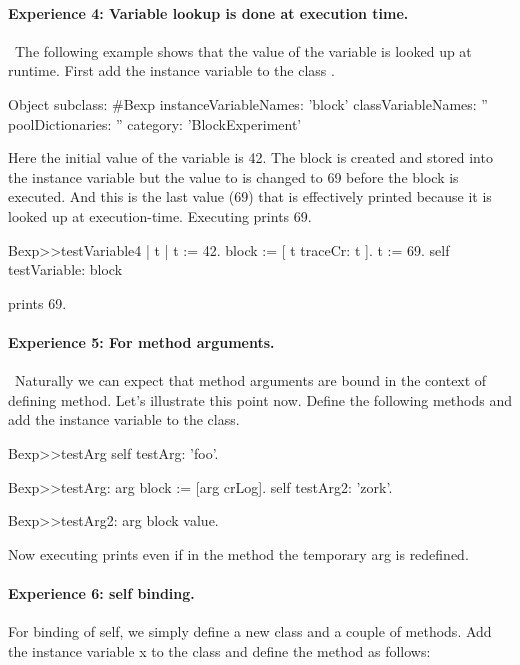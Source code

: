\documentclass[a4paper,10pt,twoside]{book}
\begin{document}
\paragraph{Experience 4: Variable lookup is done at execution time.}\
The following example shows that the value of the variable is looked up at runtime.
First add the instance variable \ct{block} to the class \ct{Bexp}.

\begin{code}{}
Object subclass: #Bexp
	instanceVariableNames: 'block'
	classVariableNames: ''
	poolDictionaries: ''
	category: 'BlockExperiment'
\end{code}

Here the initial value of the variable  is 42. The block is created and stored into the instance variable  but the value to  is changed to 69 before the block is executed. And this is the last value (69) that is effectively printed because it is looked up at execution-time. Executing  prints 69.



\begin{code}{}
Bexp>>testVariable4
	| t |
	t := 42.
	block := [ t traceCr: t ].
	t := 69.
	self testVariable: block
\end{code}

 prints 69.





\paragraph{Experience 5: For method arguments.}\
Naturally we can expect that method arguments are bound in the context of defining method. Let's illustrate this point now. Define the following methods and add the instance variable  to the class.

\begin{code}{}
Bexp>>testArg
	self testArg: 'foo'.

Bexp>>testArg: arg
	block := [arg crLog].
	self testArg2: 'zork'.

Bexp>>testArg2: arg
	block value.
\end{code}

Now executing  prints  even if in the method  the temporary arg is redefined.

\paragraph{Experience 6: self binding.}
For binding of self, we simply define a new class and a couple of methods.
Add the instance variable x to the class  and define the  method as follows:
\end{document}
